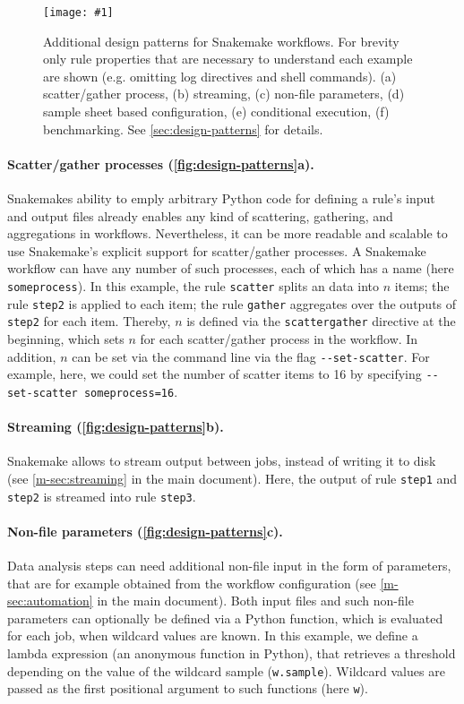 \documentclass{scrartcl}
\newcommand{\image}[1]{\centering\texttt{[image: \#1]}}
\begin{document}
\begin{figure}
	\image{design-patterns.pdf}
	\caption{Additional design patterns for Snakemake workflows.
		For brevity only rule properties that are necessary to understand each example are shown (e.g. omitting log directives and shell commands).
		(a) scatter/gather process, (b) streaming, (c) non-file parameters, (d) sample sheet based configuration, (e) conditional execution, (f) benchmarking.
		See \autoref{sec:design-patterns} for details.
	}\label{fig:design-patterns}
\end{figure}

\paragraph{Scatter/gather processes (\autoref{fig:design-patterns}a).}
Snakemakes ability to emply arbitrary Python code for defining a rule's input and output files already enables any kind of scattering, gathering, and aggregations in workflows.
Nevertheless, it can be more readable and scalable to use Snakemake's explicit support for scatter/gather processes.
A Snakemake workflow can have any number of such processes, each of which has a name (here \lstinline!someprocess!).
In this example, the rule \lstinline!scatter! splits an data into $n$ items; the rule \lstinline!step2! is applied to each item; the rule \lstinline!gather! aggregates over the outputs of \lstinline!step2! for each item.
Thereby, $n$ is defined via the \lstinline!scattergather! directive at the beginning, which sets $n$ for each scatter/gather process in the workflow.
In addition, $n$ can be set via the command line via the flag \lstinline!--set-scatter!.
For example, here, we could set the number of scatter items to 16 by specifying \lstinline!--set-scatter someprocess=16!.

\paragraph{Streaming (\autoref{fig:design-patterns}b).}
Snakemake allows to stream output between jobs, instead of writing it to disk (see \autoref{m-sec:streaming} in the main document).
Here, the output of rule \lstinline!step1! and \lstinline!step2! is streamed into rule \lstinline!step3!.

\paragraph{Non-file parameters (\autoref{fig:design-patterns}c).}
Data analysis steps can need additional non-file input in the form of parameters, that are for example obtained from the workflow configuration (see \autoref{m-sec:automation} in the main document).
Both input files and such non-file parameters can optionally be defined via a Python function, which is evaluated for each job, when wildcard values are known.
In this example, we define a lambda expression (an anonymous function in Python), that retrieves a threshold depending on the value of the wildcard sample (\lstinline!w.sample!).
Wildcard values are passed as the first positional argument to such functions (here \lstinline!w!).
\end{document}
